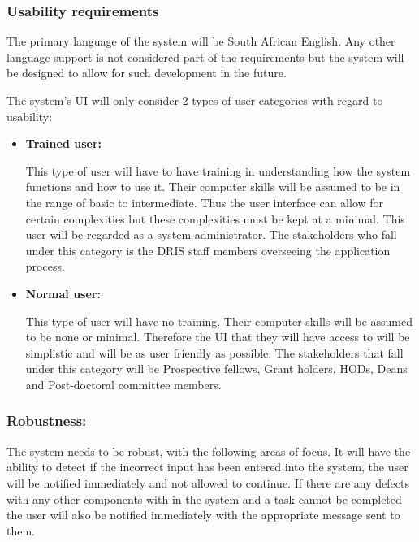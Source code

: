 \documentclass[12pt]{article}
\begin{document}
\subsubsection{Usability requirements}

\begin{flushleft}

The primary language of the system will be South African English. Any other language support is not considered part of the requirements but the system will be designed to allow for such development in the future.\\

\vspace{0.1in}

The system's UI will only consider 2 types of user categories with regard to usability:

\begin{itemize}

\item\textbf{Trained user:}

This type of user will have to have training in understanding how the system functions and how to use it. Their computer skills will be assumed to be in the range of basic to intermediate. Thus the user interface can allow for certain complexities but these complexities must be kept at a minimal. This user will be regarded as a system administrator. The stakeholders who fall under this category is the DRIS staff members overseeing the application process.

\item\textbf{Normal user:}

This type of user will have no training. Their computer skills will be assumed to be none or minimal. Therefore the UI that they will have access to will be simplistic and will be as user friendly as possible. The stakeholders that fall under this category will be Prospective fellows, Grant holders, HODs, Deans and Post-doctoral committee members.

\end{itemize}

\end{flushleft}

\vspace{0.2in}

\subsubsection{Robustness:}

\begin{flushleft}

The system needs to be robust, with the following areas of focus. It will have the ability to detect if the incorrect input has been entered into the system, the user will be notified immediately and not allowed to continue. If there are any defects with any other components with in the system and a task cannot be completed the user will also be notified immediately with the appropriate message sent to them. 
\end{flushleft}
\end{document}
